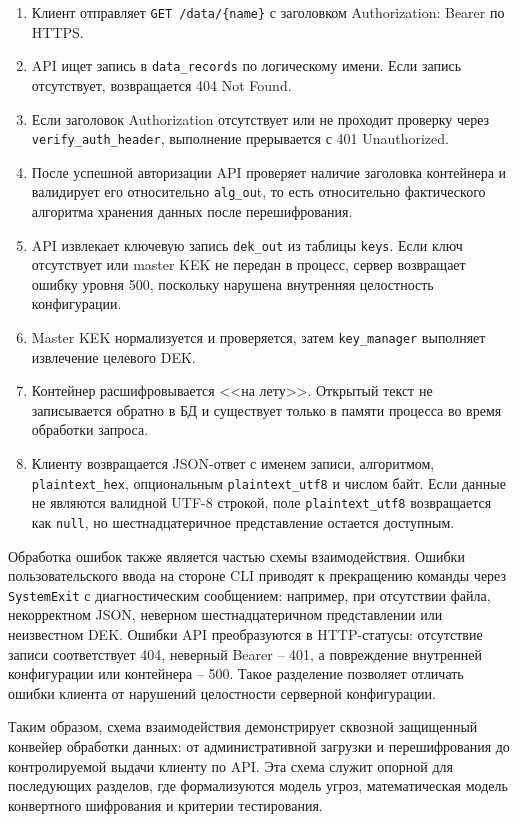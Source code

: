 \documentclass[14pt, a4paper]{extarticle}
\begin{document}
	\begin{enumerate}
	    \item Клиент отправляет \texttt{GET /data/\{name\}} с заголовком Authorization: Bearer по HTTPS.
	    \item API ищет запись в \texttt{data\_records} по логическому имени. Если запись отсутствует, возвращается 404 Not Found.
	    \item Если заголовок Authorization отсутствует или не проходит проверку через \texttt{verify\_auth\_header}, выполнение прерывается с 401 Unauthorized.
	    \item После успешной авторизации API проверяет наличие заголовка контейнера и валидирует его относительно \texttt{alg\_ou}t, то есть относительно фактического алгоритма хранения данных после перешифрования.
	    \item API извлекает ключевую запись \texttt{dek\_out} из таблицы \texttt{keys}. Если ключ отсутствует или master KEK не передан в процесс, сервер возвращает ошибку уровня 500, поскольку нарушена внутренняя целостность конфигурации.
	    \item Master KEK нормализуется и проверяется, затем \texttt{key\_manager} выполняет извлечение целевого DEK.
	    \item Контейнер расшифровывается <<на лету>>. Открытый текст не записывается обратно в БД и существует только в памяти процесса во время обработки запроса.
	    \item Клиенту возвращается JSON-ответ с именем записи, алгоритмом, \texttt{plaintext\_hex}, опциональным \texttt{plaintext\_utf8} и числом байт. Если данные не являются валидной UTF-8 строкой, поле \texttt{plaintext\_utf8} возвращается как \texttt{null}, но шестнадцатеричное представление остается доступным.
	\end{enumerate}

	Обработка ошибок также является частью схемы взаимодействия. Ошибки пользовательского ввода на стороне CLI приводят к прекращению команды через \texttt{SystemExit} с диагностическим сообщением: например, при отсутствии файла, некорректном JSON, неверном шестнадцатеричном представлении или неизвестном DEK. Ошибки API преобразуются в HTTP-статусы: отсутствие записи соответствует 404, неверный Bearer -- 401, а повреждение внутренней конфигурации или контейнера -- 500. Такое разделение позволяет отличать ошибки клиента от нарушений целостности серверной конфигурации.
	
	Таким образом, схема взаимодействия демонстрирует сквозной защищенный конвейер обработки данных: от административной загрузки и перешифрования до контролируемой выдачи клиенту по API. Эта схема служит опорной для последующих разделов, где формализуются модель угроз, математическая модель конвертного шифрования и критерии тестирования.
	
\end{document}
